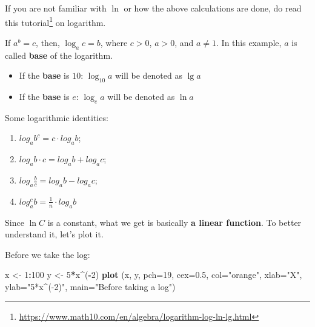 \documentclass[
]{krantz}
\makeatletter
\newenvironment{Shaded}{\begin{snugshade}}{\end{snugshade}}
\newcommand{\DataTypeTok}[1]{\textcolor[rgb]{0.27,0.27,0.27}{#1}}
\newcommand{\DecValTok}[1]{\textcolor[rgb]{0.06,0.06,0.06}{#1}}
\newcommand{\FloatTok}[1]{\textcolor[rgb]{0.06,0.06,0.06}{#1}}
\newcommand{\KeywordTok}[1]{\textcolor[rgb]{0.27,0.27,0.27}{\textbf{#1}}}
\newcommand{\NormalTok}[1]{#1}
\newcommand{\OperatorTok}[1]{\textcolor[rgb]{0.43,0.43,0.43}{\textbf{#1}}}
\newcommand{\StringTok}[1]{\textcolor[rgb]{0.5,0.5,0.5}{#1}}
\providecommand{\tightlist}{%
  \setlength{\itemsep}{0pt}\setlength{\parskip}{0pt}}
\renewcommand{\href}[2]{#2\footnote{\url{#1}}}
\newenvironment{kframe}{%
\medskip{}
\setlength{\fboxsep}{.8em}
 \def\at@end@of@kframe{}%
 \ifinner\ifhmode%
  \def\at@end@of@kframe{\end{minipage}}%
  \begin{minipage}{\columnwidth}%
 \fi\fi%
 \def\FrameCommand##1{\hskip\@totalleftmargin \hskip-\fboxsep
 \colorbox{shadecolor}{##1}\hskip-\fboxsep
     \hskip-\linewidth \hskip-\@totalleftmargin \hskip\columnwidth}%
 \MakeFramed {\advance\hsize-\width
   \@totalleftmargin\z@ \linewidth\hsize
   \@setminipage}}%
 {\par\unskip\endMakeFramed%
 \at@end@of@kframe}
\renewenvironment{Shaded}{\begin{kframe}}{\end{kframe}}
\newenvironment{rmdblock}[1]
  {
  \begin{itemize}
  \renewcommand{\labelitemi}{
    \raisebox{-.7\height}[0pt][0pt]{
      {\setkeys{Gin}{width=3em,keepaspectratio}\texttt{[image: images/\#1]}}
    }
  }
  \setlength{\fboxsep}{1em}
  \begin{kframe}
  \item
  }
  {
  \end{kframe}
  \end{itemize}
  }
\newenvironment{rmdtip}
  {\begin{rmdblock}{tip}}
  {\end{rmdblock}}
\makeatother
\begin{document}
If you are not familiar with \(\ln\) or how the above calculations are done, do read \href{https://www.math10.com/en/algebra/logarithm-log-ln-lg.html}{this tutorial} on logarithm.

\begin{rmdtip}
If \(a^b=c\), then, \(\log_a c =b\), where \(c>0\), \(a>0\), and \(a \neq 1\). In this example, \(a\) is called \textbf{base} of the logarithm.

\begin{itemize}
\tightlist
\item
  If the \textbf{base} is \(10\): \(\log_{10} a\) will be denoted as \emph{\(\lg a\)}
\item
  If the \textbf{base} is \(e\): \(\log_e a\) will be denoted as \emph{\(\ln a\)}
\end{itemize}

Some logarithmic identities:

\begin{enumerate}
\def\labelenumi{\arabic{enumi}.}
\tightlist
\item
  \(log_a b^c = c \cdot log_a b\);
\item
  \(log_a {b \cdot c} = log_a b + log_a c\);
\item
  \(log_a \frac{b}{c} = log_a b - log_a c\);
\item
  \(log_a^c b = \frac{1}{n} \cdot log_a b\)
\end{enumerate}
\end{rmdtip}

Since \(\ln C\) is a constant, what we get is basically \textbf{a linear function}.
To better understand it, let's plot it.

Before we take the log:

\begin{Shaded}
\begin{Highlighting}[]
\NormalTok{x <-}\StringTok{ }\DecValTok{1}\OperatorTok{:}\DecValTok{100}
\NormalTok{y <-}\StringTok{ }\DecValTok{5}\OperatorTok{*}\NormalTok{x}\OperatorTok{^}\NormalTok{(}\OperatorTok{-}\DecValTok{2}\NormalTok{)}
\KeywordTok{plot}\NormalTok{ (x, y, }\DataTypeTok{pch=}\DecValTok{19}\NormalTok{, }\DataTypeTok{cex=}\FloatTok{0.5}\NormalTok{, }\DataTypeTok{col=}\StringTok{"orange"}\NormalTok{,}
      \DataTypeTok{xlab=}\StringTok{"X"}\NormalTok{, }\DataTypeTok{ylab=}\StringTok{"5*x^(-2)"}\NormalTok{,}
      \DataTypeTok{main=}\StringTok{"Before taking a log"}\NormalTok{)}
\end{Highlighting}
\end{Shaded}
\end{document}
